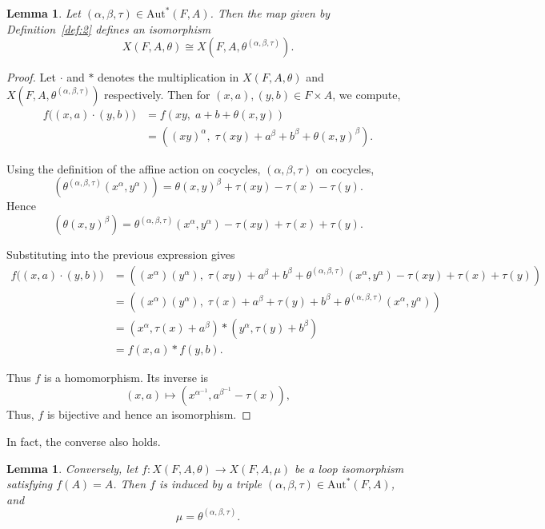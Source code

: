 \documentclass[12pt,a4paper]{amsart}
\newtheorem{lemma}[theorem]{Lemma}
\theoremstyle{definition}
\begin{document}
\begin{lemma} \label{lemma:1}
Let $(\alpha,\beta,\tau)\in\mathrm{Aut}^{\!*}(F,A)$. 
Then the map given by Definition~\ref{def:2} defines an isomorphism
\[
X(F,A,\theta)
\cong
X(F,A,\theta^{(\alpha,\beta,\tau)}).
\]
\end{lemma}
\begin{proof}
Let $\cdot$ and $\ast$ denotes the multiplication in $X(F,A,\theta)$ and $X(F,A,\theta^{(\alpha,\beta,\tau)})$ respectively. Then for $(x,a),(y,b)\in F\times A$, we compute,
\begin{align*}
f\big((x,a)\cdot(y,b)\big)
&= f(xy,\; a+b+\theta(x,y)) \\
&= ((xy)^\alpha,\; \tau(xy)+ a^{\beta} + b^{\beta} +\theta(x,y)^{\beta}).
\end{align*}

Using the definition of the affine action on cocycles,
$(\alpha,\beta,\tau)$ on cocycles,
\[
(\theta^{(\alpha,\beta,\tau)}(x^{\alpha},y^{\alpha}))
= \theta(x,y)^{\beta}+\tau(xy)-\tau(x)-\tau(y).
\]
Hence
\[
(\theta(x,y)^{\beta}) =\theta^{(\alpha,\beta,\tau)}( x^{\alpha},y^{\alpha})
 -\tau(xy)+\tau(x)+\tau(y).
\]

Substituting into the previous expression gives
\begin{align*}
f\big((x,a)\cdot(y,b)\big)
&= ((x^{\alpha})(y^{\alpha}),\; \tau(xy)\!+\! a^{\beta}\!+\! b^{\beta}
 \!+\! \theta^{(\alpha,\beta,\tau)}(x^{\alpha},y^{\alpha}) 
 \!-\!\tau(xy)\!+\!\tau(x)\!+\!\tau(y))\\
&= ((x^{\alpha})(y^{\alpha}),\; \tau(x)+ a^{\beta}+\tau(y)+ b^{\beta}
 +\theta^{(\alpha,\beta,\tau)}(x^{\alpha},y^{\alpha})) \\
&= (x^{\alpha},\tau(x)+ a^{\beta}) \ast(y^{\alpha},\tau(y)+b^{\beta}) \\
&= f(x,a)\ast f(y,b).
\end{align*}

Thus $f$ is a homomorphism. Its inverse is
\[
(x,a)\mapsto(x^{\alpha^{-1}}, a^{\beta^{-1}} -\tau(x)),
\]
Thus, $f$ is bijective and hence an isomorphism.
\end{proof}

In fact, the converse also holds.

\begin{lemma} \label{lemma:2}
Conversely, let 
$f:X(F,A,\theta)\to X(F,A,\mu)$ 
be a loop isomorphism satisfying $f(A)=A$. 
Then $f$ is induced by a triple 
$(\alpha,\beta,\tau)\in\mathrm{Aut}^{\!*}(F,A)$, and
\[
\mu=\theta^{(\alpha,\beta,\tau)}.
\]
\end{lemma}
\end{document}
